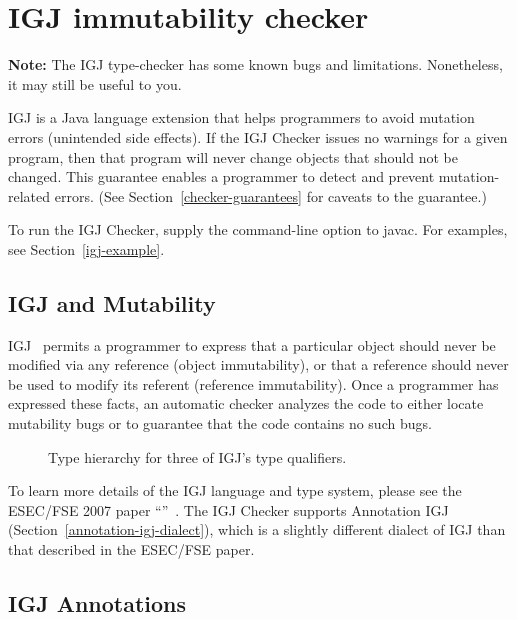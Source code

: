 \htmlhr
\chapter{IGJ immutability checker\label{igj-checker}}
\label{oigj-checker}

\textbf{Note:} The IGJ type-checker has some known bugs and limitations.
Nonetheless, it may still be useful to you.

IGJ is a Java language extension that helps programmers to avoid mutation errors
(unintended side effects).
If the IGJ Checker issues no warnings for a given program, then that program
will never change objects that should not be changed.  This guarantee
enables a programmer to detect and prevent mutation-related errors.
(See Section~\ref{checker-guarantees} for caveats to the guarantee.)

To run the IGJ Checker, supply the 
command-line option to javac.  For examples, see Section~\ref{igj-example}.


\section{IGJ and Mutability\label{igj-and-mutability}}

IGJ~\cite{ZibinPAAKE2007} permits a
programmer to express that a particular object should never be modified via any
reference (object immutability), or that a reference should never be used to
modify its referent (reference immutability). Once a programmer has expressed
these facts, an automatic checker analyzes the code to either locate mutability
bugs or to guarantee that the code contains no such bugs.

\begin{figure}
\caption{Type hierarchy for three of IGJ's type qualifiers.}
\label{fig:igj-hierarchy}
\end{figure}

To learn more details of the IGJ language and type system, please see the
ESEC/FSE 2007 paper ``''~\cite{ZibinPAAKE2007}.
The IGJ Checker supports Annotation IGJ (Section~\ref{annotation-igj-dialect}),
which is a slightly different dialect
of IGJ than that described in the ESEC/FSE paper.


\section{IGJ Annotations\label{igj-annotations}}

